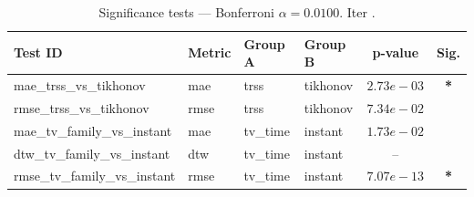 ﻿%
\begin{table}[ht]
\centering
\caption[EEG reconstruction - Iteration it19]{Significance tests — Bonferroni $\alpha=0.0100$. Iter .}
\label{tab:sig_it19_synthetic_beta_high_missing}
\small
\begin{tabular}{llllcc}
\toprule
Test ID & Metric & Group A & Group B & p-value & Sig. \\
\midrule
mae\_trss\_vs\_tikhonov & mae & trss & tikhonov & $2.73e-03$ & \textbf{*} \\
rmse\_trss\_vs\_tikhonov & rmse & trss & tikhonov & $7.34e-02$ &  \\
mae\_tv\_family\_vs\_instant & mae & tv\_time & instant & $1.73e-02$ &  \\
dtw\_tv\_family\_vs\_instant & dtw & tv\_time & instant & -- &  \\
rmse\_tv\_family\_vs\_instant & rmse & tv\_time & instant & $7.07e-13$ & \textbf{*} \\
\bottomrule
\end{tabular}
\end{table}







